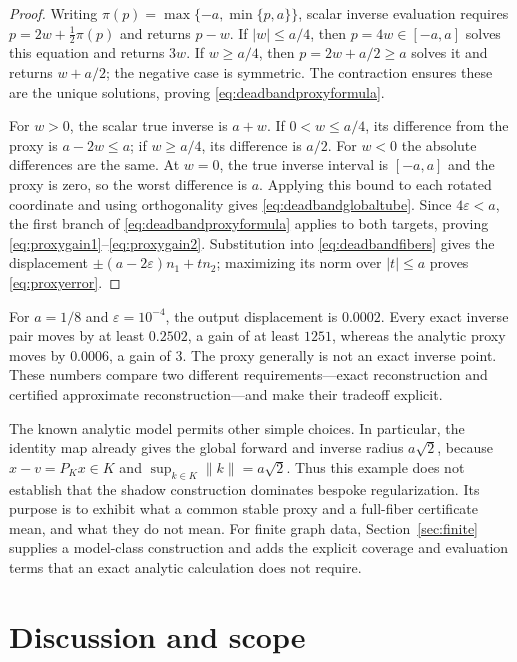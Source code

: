 \documentclass[11pt]{article}
\numberwithin{equation}{section}
\theoremstyle{definition}
\theoremstyle{remark}
\newcommand{\norm}[1]{\lVert #1\rVert}
\newcommand{\eps}{\varepsilon}
\begin{document}
\begin{proof}
Writing $\pi(p)=\max\{-a,\min\{p,a\}\}$, scalar inverse evaluation
requires $p=2w+\tfrac12\pi(p)$ and returns $p-w$.
If $|w|\le a/4$, then $p=4w\in[-a,a]$ solves this equation and
returns $3w$. If $w\ge a/4$, then $p=2w+a/2\ge a$ solves it and
returns $w+a/2$; the negative case is symmetric. The contraction
ensures these are the unique solutions, proving
\eqref{eq:deadbandproxyformula}.

For $w>0$, the scalar true inverse is $a+w$. If $0<w\le a/4$,
its difference from the proxy is $a-2w\le a$; if $w\ge a/4$, its
difference is $a/2$. For $w<0$ the absolute differences are the
same. At $w=0$, the true inverse interval is $[-a,a]$ and the proxy
is zero, so the worst difference is $a$. Applying this bound to
each rotated coordinate and using orthogonality gives
\eqref{eq:deadbandglobaltube}. Since $4\eps<a$, the first branch
of \eqref{eq:deadbandproxyformula} applies to both targets, proving
\eqref{eq:proxygain1}--\eqref{eq:proxygain2}. Substitution into
\eqref{eq:deadbandfibers} gives the displacement
$\pm(a-2\eps)n_1+tn_2$; maximizing its norm over $|t|\le a$ proves
\eqref{eq:proxyerror}.
\end{proof}

For $a=1/8$ and $\eps=10^{-4}$, the output displacement is $0.0002$.
Every exact inverse pair moves by at least $0.2502$, a gain of at
least $1251$, whereas the analytic proxy moves by $0.0006$, a gain
of $3$. The proxy generally is not an exact inverse point. These
numbers compare two different requirements---exact reconstruction and
certified approximate reconstruction---and make their tradeoff explicit.

The known analytic model permits other simple choices. In particular,
the identity map already gives the global forward and inverse radius
$a\sqrt2$, because $x-v=P_Kx\in K$ and
$\sup_{k\in K}\norm k=a\sqrt2$. Thus this example does not establish
that the shadow construction dominates bespoke regularization. Its
purpose is to exhibit what a common stable proxy and a full-fiber
certificate mean, and what they do not mean. For finite graph data,
Section~\ref{sec:finite} supplies a model-class construction and adds
the explicit coverage and evaluation terms that an exact analytic
calculation does not require.

\section{Discussion and scope}\label{sec:discussion}
\end{document}
